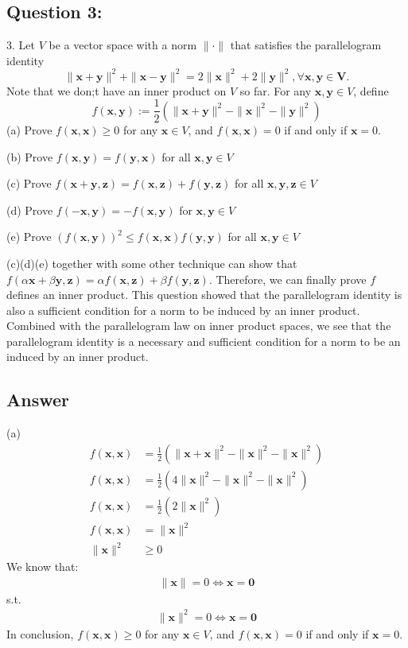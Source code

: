 \documentclass[a4paper,12pt]{article}
\begin{document}
\subsection*{Question 3:}
3. Let \(V\) be a vector space with a norm \(\|\cdot\|\) that satisfies the parallelogram identity
\[
    \|\bm{x} + \bm{y}\|^2 + \|\bm{x} - \bm{y}\|^2 = 2\|\bm{x}\|^2 + 2\|\bm{y}\|^2, \forall \bm{x}, \bm{y} \in \bm{V}.
\]
Note that we don;t have an inner product on \(V\) so far. For any \(\bm{x},\bm{y} \in V\), define
\[
    f(\bm{x}, \bm{y}) := \frac 1 2 (\|\bm{x} + \bm{y}\|^2 - \|\bm{x}\|^2 - \|\bm{y}\|^2)
\]
(a) Prove \(f(\bm{x}, \bm{x}) \geq 0\) for any \(\bm{x} \in V\), and \(f(\bm{x}, \bm{x}) = 0\) if and only if \(\bm{x} = 0\).

(b) Prove \(f(\bm{x}, \bm{y}) = f(\bm{y}, \bm{x})\) for all \(\bm{x}, \bm{y} \in V\)

(c) Prove \(f(\bm{x}+\bm{y}, \bm{z}) = f(\bm{x}, \bm{z}) + f(\bm{y}, \bm{z})\) for all \( \bm{x}, \bm{y}, \bm{z}\in V\)

(d) Prove \(f(-\bm{x}, \bm{y}) = -f(\bm{x}, \bm{y})\) for \(\bm{x}, \bm{y}\in V\)

(e) Prove \((f(\bm{x}, \bm{y}))^2 \leq f(\bm{x}, \bm{x})f(\bm{y}, \bm{y})\) for all \(\bm{x}, \bm{y} \in V\)

(c)(d)(e) together with some other technique can show that \(f(\alpha \bm{x} + \beta \bm{y}, \bm{z})  = \alpha f(\bm{x}, \bm{z}) + \beta f(\bm{y}, \bm{z})\).
Therefore, we can finally prove \(f\) defines an inner product. This question showed that the parallelogram
identity is also a sufficient condition for a norm to be induced by an inner product. Combined with
the parallelogram law on inner product spaces, we see that the parallelogram identity is a necessary
and sufficient condition for a norm to be an induced by an inner product.

\subsection*{Answer}
(a) 
\begin{align*}
    f(\bm{x}, \bm{x}) &= \frac 1 2 (\|\bm{x}+\bm{x}\|^2 - \|\bm{x}\|^2 - \|\bm{x}\|^2 ) \\
    f(\bm{x}, \bm{x}) &= \frac 1 2 (4\|\bm{x}\|^2 - \|\bm{x}\|^2 - \|\bm{x}\|^2 ) \\
    f(\bm{x}, \bm{x}) &= \frac 1 2 (2\|\bm{x}\|^2) \\
    f(\bm{x}, \bm{x}) &= \|\bm{x}\|^2 \\
    \|\bm{x}\|^2 &\geq 0 
\end{align*}
We know that:
\begin{align}
    \|\bm{x}\| = 0 \iff \bm{x} = \bm{0}
\end{align}
s.t.
\begin{align*}
    \|\bm{x}\|^2 = 0 \iff \bm{x} = \bm{0}
\end{align*}
In conclusion, \(f(\bm{x}, \bm{x}) \geq 0\) for any \(\bm{x} \in V\), and \(f(\bm{x}, \bm{x}) = 0\) if and only if \(\bm{x} = 0\).
\end{document}
